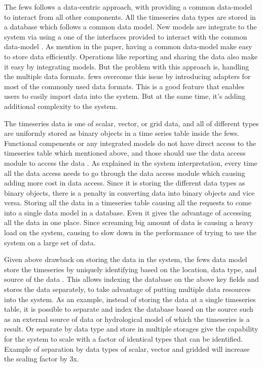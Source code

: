 The \acrshort{fews} follows a data-centric approach, with providing a common data-model to interact from all other components. All the timeseries data types are stored in a database which follows a common data model. New models are integrate to the system via using a one of the interfaces provided to interact with the common data-model \cite{Werner2013TheSystem}. As mention in the paper, having a common data-model make easy to store data efficiently. Operations like reporting and sharing the data also make it easy by integrating models. But the problem with this approach is, handling the multiple data formats. \acrshort{fews} overcome this issue by introducing adapters for most of the commonly used data formats. This is a good feature that enables users to easily import data into the system. But at the same time, it's adding additional complexity to the system.

The timeseries data is one of scalar, vector, or grid data, and all of different types are uniformly stored as binary objects in a time series table inside the \acrshort{fews}. Functional compenents or any integrated models do not have direct access to the timeseries table which mentioned above, and those should use the data access module to access the data \cite{Werner2013TheSystem}. As explained in the system interpretation, every time all the data access needs to go through the data access module which causing adding more cost in data access. Since it is storing the different data types as binary objects, there is a penalty in converting data into binary objects and vice versa. Storing all the data in a timeseries table causing all the requests to come into a single data model in a database. Even it gives the advantage of accessing all the data in one place. Since screaming big amount of data is causing a heavy load on the system, causing to slow down in the performance of trying to use the system on a large set of data.

Given above drawback on storing the data in the system, the \acrshort{fews} data model store the timeseries by uniquely identifying based on the location, data type, and source of the data \cite{Werner2013TheSystem}. This allows indexing the database on the above key fields and stores the data separately, to take advantage of putting multiple data resources into the system. As an example, instead of storing the data at a single timeseries table, it is possible to separate and index the database based on the source such as an external source of data or hydrological model of which the timeseries is a result. Or separate by data type and store in multiple storages give the capability for the system to scale with a factor of identical types that can be identified. Example of separation by data types of scalar, vector and gridded will increase the scaling factor by 3x.

